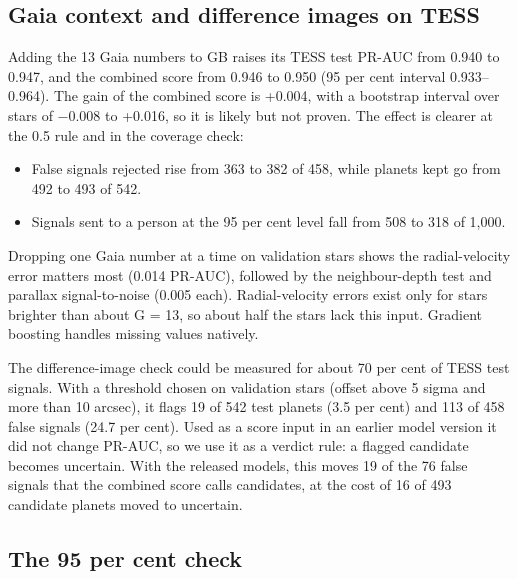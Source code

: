\documentclass[fleqn,usenatbib]{mnras}
\providecommand{\tightlist}{\setlength{\itemsep}{0pt}\setlength{\parskip}{0pt}}
\begin{document}
\subsection{Gaia context and difference images on TESS}

Adding the 13 Gaia numbers to GB raises its TESS test PR-AUC from 0.940 to 0.947, and the combined score from 0.946 to 0.950 (95 per cent interval 0.933--0.964). The gain of the combined score is +0.004, with a bootstrap interval over stars of −0.008 to +0.016, so it is likely but not proven. The effect is clearer at the 0.5 rule and in the coverage check:

\begin{itemize}
\tightlist
\item
  False signals rejected rise from 363 to 382 of 458, while planets kept go from 492 to 493 of 542.
\item
  Signals sent to a person at the 95 per cent level fall from 508 to 318 of 1,000.
\end{itemize}

Dropping one Gaia number at a time on validation stars shows the radial-velocity error matters most (0.014 PR-AUC), followed by the neighbour-depth test and parallax signal-to-noise (0.005 each). Radial-velocity errors exist only for stars brighter than about G = 13, so about half the stars lack this input. Gradient boosting handles missing values natively.

The difference-image check could be measured for about 70 per cent of TESS test signals. With a threshold chosen on validation stars (offset above 5 sigma and more than 10 arcsec), it flags 19 of 542 test planets (3.5 per cent) and 113 of 458 false signals (24.7 per cent). Used as a score input in an earlier model version it did not change PR-AUC, so we use it as a verdict rule: a flagged candidate becomes uncertain. With the released models, this moves 19 of the 76 false signals that the combined score calls candidates, at the cost of 16 of 493 candidate planets moved to uncertain.

\subsection{The 95 per cent check}
\end{document}
